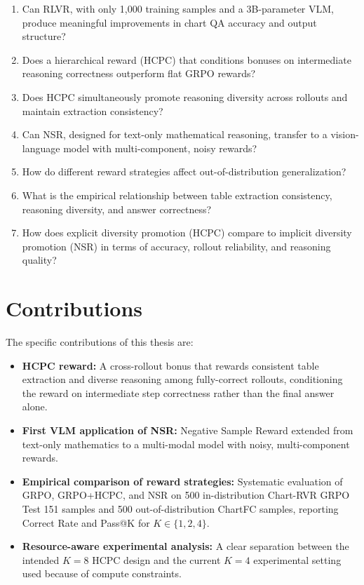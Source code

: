 \documentclass{iutbscthesis}
\begin{document}
\begin{enumerate}
    \item Can RLVR, with only 1,000 training samples and a 3B-parameter VLM, produce meaningful improvements in chart QA accuracy and output structure?
    \item Does a hierarchical reward (HCPC) that conditions bonuses on intermediate reasoning correctness outperform flat GRPO rewards?
    \item Does HCPC simultaneously promote reasoning diversity across rollouts and maintain extraction consistency?
    \item Can NSR, designed for text-only mathematical reasoning, transfer to a vision-language model with multi-component, noisy rewards?
    \item How do different reward strategies affect out-of-distribution generalization?
    \item What is the empirical relationship between table extraction consistency, reasoning diversity, and answer correctness?
    \item How does explicit diversity promotion (HCPC) compare to implicit diversity promotion (NSR) in terms of accuracy, rollout reliability, and reasoning quality?
\end{enumerate}

\section{Contributions}

The specific contributions of this thesis are:

\begin{itemize}
    \item \textbf{HCPC reward:} A cross-rollout bonus that rewards consistent table extraction and diverse reasoning among fully-correct rollouts, conditioning the reward on intermediate step correctness rather than the final answer alone.
    \item \textbf{First VLM application of NSR:} Negative Sample Reward extended from text-only mathematics to a multi-modal model with noisy, multi-component rewards.
    \item \textbf{Empirical comparison of reward strategies:} Systematic evaluation of GRPO, GRPO+HCPC, and NSR on 500 in-distribution Chart-RVR GRPO Test 151 samples and 500 out-of-distribution ChartFC samples, reporting Correct Rate and Pass@K for $K \in \{1, 2, 4\}$.
    \item \textbf{Resource-aware experimental analysis:} A clear separation between the intended $K=8$ HCPC design and the current $K=4$ experimental setting used because of compute constraints.
\end{itemize}
\end{document}
